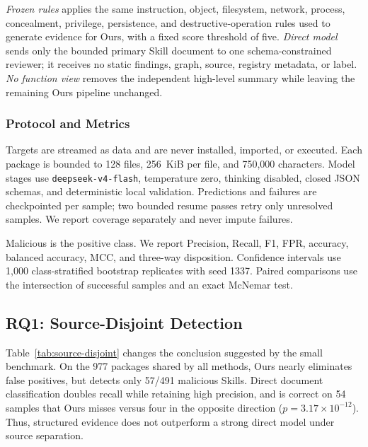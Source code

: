 \emph{Frozen rules} applies the same instruction, object, filesystem, network,
process, concealment, privilege, persistence, and destructive-operation rules
used to generate evidence for Ours, with a fixed score threshold of five.
\emph{Direct model} sends only the bounded primary Skill document to one
schema-constrained reviewer; it receives no static findings, graph, source,
registry metadata, or label. \emph{No function view} removes the independent
high-level summary while leaving the remaining Ours pipeline unchanged.

\subsubsection{Protocol and Metrics}

Targets are streamed as data and are never installed, imported, or executed.
Each package is bounded to 128 files, 256~KiB per file, and 750,000 characters.
Model stages use \texttt{deepseek-v4-flash}, temperature zero, thinking
disabled, closed JSON schemas, and deterministic local validation. Predictions
and failures are checkpointed per sample; two bounded resume passes retry only
unresolved samples. We report coverage separately and never impute failures.

Malicious is the positive class. We report Precision, Recall, F1, FPR,
accuracy, balanced accuracy, MCC, and three-way disposition. Confidence
intervals use 1,000 class-stratified bootstrap replicates with seed 1337.
Paired comparisons use the intersection of successful samples and an exact
McNemar test.

\subsection{RQ1: Source-Disjoint Detection}

Table~\ref{tab:source-disjoint} changes the conclusion suggested by the small
benchmark. On the 977 packages shared by all methods, Ours nearly eliminates
false positives, but detects only 57/491 malicious Skills. Direct document
classification doubles recall while retaining high precision, and is correct
on 54 samples that Ours misses versus four in the opposite direction
($p=3.17\times10^{-12}$). Thus, structured evidence does not outperform a
strong direct model under source separation.


